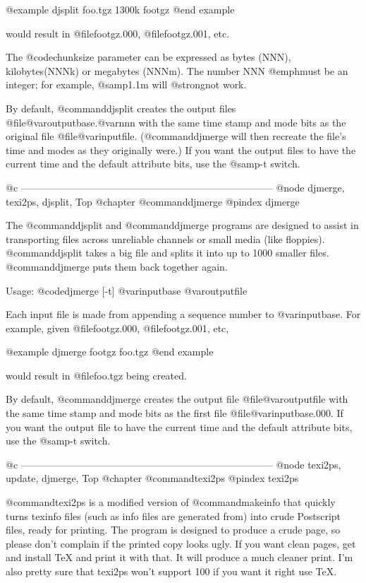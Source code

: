 @example
djsplit foo.tgz 1300k footgz
@end example

would result in @file{footgz.000}, @file{footgz.001}, etc.

The @code{chunksize} parameter can be expressed as bytes (NNN),
kilobytes(NNNk) or megabytes (NNNm).  The number NNN @emph{must} be an
integer; for example, @samp{1.1m} will @strong{not} work.

By default, @command{djsplit} creates the output files
@file{@var{outputbase}.@var{nnn}} with the same time stamp and mode bits
as the original file @file{@var{inputfile}}.  (@command{djmerge} will then
recreate the file's time and modes as they originally were.)  If you
want the output files to have the current time and the default attribute
bits, use the @samp{-t} switch.

@c -----------------------------------------------------------------------------
@node djmerge, texi2ps, djsplit, Top
@chapter @command{djmerge}
@pindex djmerge

The @command{djsplit} and @command{djmerge} programs are designed to assist in
transporting files across unreliable channels or small media (like
floppies).  @command{djsplit} takes a big file and splits it into up to 1000
smaller files.  @command{djmerge} puts them back together again.

Usage: @code{djmerge [-t] @var{inputbase} @var{outputfile}}

Each input file is made from appending a sequence number to
@var{inputbase}.  For example, given @file{footgz.000},
@file{footgz.001}, etc,

@example
djmerge footgz foo.tgz
@end example

would result in @file{foo.tgz} being created.

By default, @command{djmerge} creates the output file
@file{@var{outputfile}} with the same time stamp and mode bits as the
first file @file{@var{inputbase}.000}.  If you want the output file to
have the current time and the default attribute bits, use the @samp{-t}
switch.

@c -----------------------------------------------------------------------------
@node texi2ps, update, djmerge, Top
@chapter @command{texi2ps}
@pindex texi2ps

@command{texi2ps} is a modified version of @command{makeinfo} that quickly turns
texinfo files (such as info files are generated from) into crude
Postscript files, ready for printing.  The program is designed to
produce a crude page, so please don't complain if the printed copy looks
ugly.  If you want clean pages, get and install TeX and print it with
that.  It will produce a much cleaner print.  I'm also pretty sure that
texi2ps won't support 100%
if you want it right use TeX.

